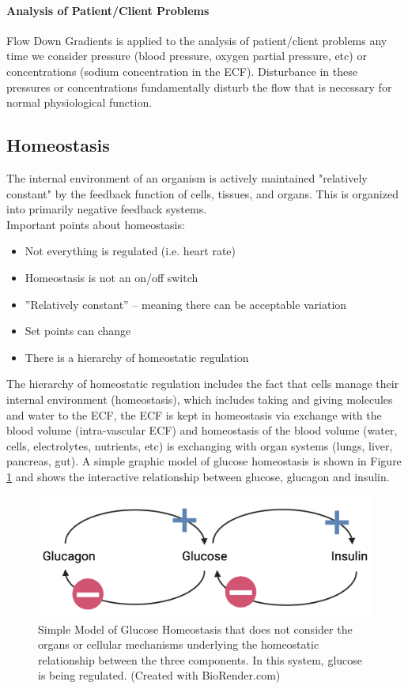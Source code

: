 \paragraph{Analysis of Patient/Client Problems}
Flow Down Gradients is applied to the analysis of patient/client problems any time we consider pressure (blood pressure, oxygen partial pressure, etc) or concentrations (sodium concentration in the ECF). Disturbance in these pressures or concentrations fundamentally disturb the flow that is necessary for normal physiological function.

\subsection{Homeostasis}
The internal environment of an organism is actively maintained "relatively constant" by the feedback function of cells, tissues, and organs. This is organized into primarily negative feedback systems.\\
Important points about homeostasis:
\begin{itemize}
    \item Not everything is regulated (i.e. heart rate)
    \item Homeostasis is not an on/off switch
    \item ”Relatively constant” – meaning there can be acceptable variation
    \item Set points can change
    \item There is a hierarchy of homeostatic regulation
\end{itemize}

The hierarchy of homeostatic regulation includes the fact that cells manage their internal environment (homeostasis), which includes taking and giving molecules and water to the ECF, the ECF is kept in homeostasis via exchange with the blood volume (intra-vascular ECF) and homeostasis of the blood volume (water, cells, electrolytes, nutrients, etc) is exchanging with organ systems (lungs, liver, pancreas, gut). A simple graphic model of glucose homeostasis is shown in Figure \ref{fig:glucose_homeo} and shows the interactive relationship between glucose, glucagon and insulin.

\begin{figure}[!ht]
    \centering
    \includegraphics[width=1\linewidth]{./figure/glucose_homeo.png}
    \caption{Simple Model of Glucose Homeostasis that does not consider the organs or cellular mechanisms underlying the homeostatic relationship between the three components. In this system, glucose is being regulated. \footnotesize{(Created with BioRender.com)}}
    \label{fig:glucose_homeo}
\end{figure}

